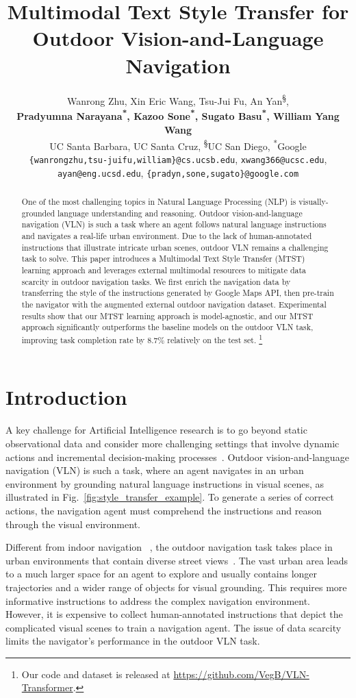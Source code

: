 \documentclass[11pt,a4paper]{article}
\title{Multimodal Text Style Transfer for\\ Outdoor Vision-and-Language Navigation}
\author{Wanrong Zhu\textsuperscript{\dag}, Xin Eric Wang\textsuperscript{\ddag}, Tsu-Jui Fu\textsuperscript{\dag}, An Yan\textsuperscript{\S}, 
\\ \textbf{Pradyumna Narayana\textsuperscript{*}, 
Kazoo Sone\textsuperscript{*}, Sugato Basu\textsuperscript{*}, William Yang Wang\textsuperscript{\dag}} \\
\textsuperscript{\dag}UC Santa Barbara, 
\textsuperscript{\ddag}UC Santa Cruz,
\textsuperscript{\S}UC San Diego,
\textsuperscript{*}Google \\
\texttt{\small \{wanrongzhu,tsu-juifu,william\}@cs.ucsb.edu}, 
\texttt{\small xwang366@ucsc.edu},\\
\texttt{\small ayan@eng.ucsd.edu},
\texttt{\small \{pradyn,sone,sugato\}@google.com}
}
\date{}
\begin{document}
\maketitle
\begin{abstract}

One of the most challenging topics in Natural Language Processing (NLP) is visually-grounded language understanding and reasoning. Outdoor vision-and-language navigation (VLN) is such a task where an agent follows natural language instructions and navigates a real-life urban environment. Due to the lack of human-annotated instructions that illustrate  intricate urban scenes, outdoor VLN remains a challenging task to solve.
This paper introduces a Multimodal Text Style Transfer (MTST) learning approach and leverages external multimodal resources to mitigate data scarcity in outdoor navigation tasks. 
We first enrich the navigation data by transferring the style of the instructions generated by Google Maps API, then pre-train the navigator with the augmented external outdoor navigation dataset.
Experimental results show that our MTST learning approach is model-agnostic, and our MTST approach significantly outperforms the baseline models on the outdoor VLN task, improving task completion rate by 8.7\% relatively on the test set. 
\footnote{Our code and dataset is released at \url{https://github.com/VegB/VLN-Transformer}.}
\end{abstract}

\section{Introduction}

A key challenge for Artificial Intelligence research is to go beyond static observational data and consider more challenging settings that involve dynamic actions and incremental decision-making processes~\cite{pearl2018book}.
Outdoor vision-and-language navigation (VLN) is such a task, where an agent navigates in an urban environment by grounding natural language instructions in visual scenes, as illustrated in Fig.~\ref{fig:style_transfer_example}. 
To generate a series of correct actions, the navigation agent must comprehend the instructions and reason through the visual environment. 

Different from indoor navigation ~\cite{anderson2018r2r,Wang-2018,fried2018speakerfollower,wang2019reinforced,ma2019self,tan2019learning,ma2019regretful,ke2019tactical}, the outdoor navigation task takes place in urban environments that contain diverse street views~\cite{mirowski2018learning,chen2019touchdown,mehta2020retouchdown}. 
The vast urban area leads to a much larger space for an agent to explore and usually contains longer trajectories and a wider range of objects for visual grounding. This requires more informative instructions to address the complex navigation environment. 
However, it is expensive to collect human-annotated instructions that depict the complicated visual scenes to train a navigation agent. The issue of data scarcity limits the navigator's performance in the outdoor VLN task. 
\end{document}

